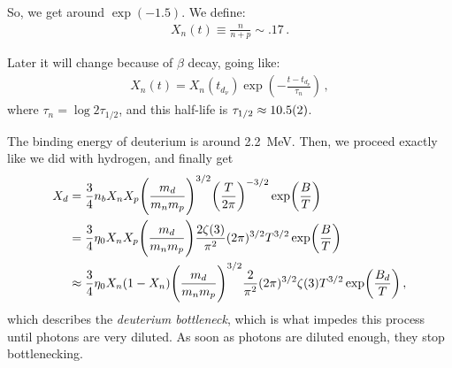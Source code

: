 \documentclass[main.tex]{subfiles}
\begin{document}
So, we get around \(\exp(-1.5)\).
We define: 
%
\begin{align}
  X_n (t) \equiv \frac{n}{n+p} \sim \num{.17}
\,.
\end{align}

Later it will change because of \(\beta \) decay, going like: 
%
\begin{align}
  X_n(t) = X_n(t_{d_\nu }) \exp( - \frac{t - t_{d_\nu }}{\tau _n})
\,,
\end{align}
%
where \(\tau _n = \log 2 \tau_{1/2}\), and this half-life is \(\tau_{1/2} \approx \num{10.5+-0.2}\).

The binding energy of deuterium is around \SI{2.2}{MeV}.
Then, we proceed exactly like we did with hydrogen, and finally get 
%
\begin{subequations}
\begin{align}
  X_d &= \frac{3}{4} n_b X_n X_p \qty(\frac{m_d}{m_nm_p})^{3/2} \qty(\frac{T}{2 \pi })^{-3/2} \exp(\frac{B}{T}) \\
  &= \frac{3}{4} \eta_0 X_n X_p \qty(\frac{m_d}{m_nm_p})
  \frac{2 \zeta (3)}{\pi^2} (2 \pi )^{3/2} T^{3/2} \exp(\frac{B}{T})  \\
  &\approx \frac{3}{4} \eta_0 X_n (1-X_n) \qty(\frac{m_d}{m_nm_p})^{3/2} \frac{2}{\pi^2} (2 \pi )^{3/2} \zeta (3) T^{3/2} \exp(\frac{B_d}{T})
\,,
\end{align}
\end{subequations}
%
which describes the \emph{deuterium bottleneck}, which is what impedes this process until photons are very diluted.
As soon as photons are diluted enough, they stop bottlenecking.
\end{document}
